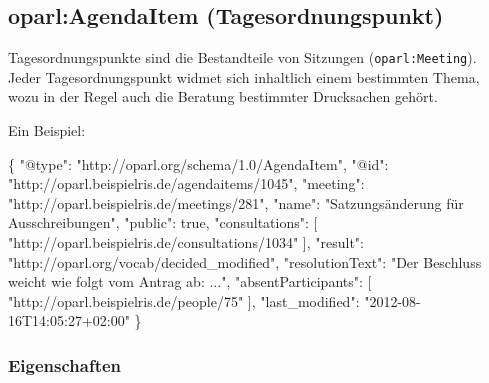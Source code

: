 \documentclass[,a4paper]{article}
\newenvironment{Shaded}{}{}
\newcommand{\DataTypeTok}[1]{\textcolor[rgb]{0.56,0.13,0.00}{{#1}}}
\newcommand{\DecValTok}[1]{\textcolor[rgb]{0.25,0.63,0.44}{{#1}}}
\newcommand{\StringTok}[1]{\textcolor[rgb]{0.25,0.44,0.63}{{#1}}}
\newcommand{\NormalTok}[1]{{#1}}
\begin{document}
\subsection{oparl:AgendaItem
(Tagesordnungspunkt)}\label{oparlux5fagendaitem}

Tagesordnungspunkte sind die Bestandteile von Sitzungen
(\texttt{oparl:Meeting}). Jeder Tagesordnungspunkt widmet sich
inhaltlich einem bestimmten Thema, wozu in der Regel auch die Beratung
bestimmter Drucksachen gehört.

Ein Beispiel:

\begin{Shaded}
\begin{Highlighting}[]
\NormalTok{\{}
    \DataTypeTok{"@type"}\NormalTok{: }\StringTok{"http://oparl.org/schema/1.0/AgendaItem"}\NormalTok{,}
    \DataTypeTok{"@id"}\NormalTok{: }\StringTok{"http://oparl.beispielris.de/agendaitems/1045"}\NormalTok{,}
    \DataTypeTok{"meeting"}\NormalTok{: }\StringTok{"http://oparl.beispielris.de/meetings/281"}\NormalTok{,}
    \DataTypeTok{"name"}\NormalTok{: }\StringTok{"Satzungsänderung für Ausschreibungen"}\NormalTok{,}
    \DataTypeTok{"public"}\NormalTok{: }\DecValTok{true}\NormalTok{,}
    \DataTypeTok{"consultations"}\NormalTok{: [}
        \StringTok{"http://oparl.beispielris.de/consultations/1034"}
    \NormalTok{],}
    \DataTypeTok{"result"}\NormalTok{: }\StringTok{"http://oparl.org/vocab/decided_modified"}\NormalTok{,}
    \DataTypeTok{"resolutionText"}\NormalTok{: }\StringTok{"Der Beschluss weicht wie folgt vom Antrag ab: ..."}\NormalTok{,}
    \DataTypeTok{"absentParticipants"}\NormalTok{: [}
        \StringTok{"http://oparl.beispielris.de/people/75"}
    \NormalTok{],}
    \DataTypeTok{"last_modified"}\NormalTok{: }\StringTok{"2012-08-16T14:05:27+02:00"}
\NormalTok{\}}
\end{Highlighting}
\end{Shaded}

\subsubsection{Eigenschaften}\label{eigenschaften-5}
\end{document}
